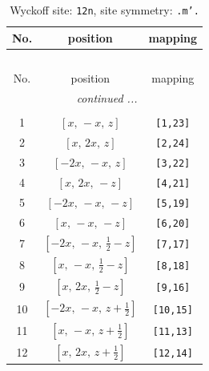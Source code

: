 \documentclass[fleqn,8pt]{jsarticle}
\begin{document}
\begin{longtable}{ccc}
\caption{Wyckoff site: {\tt 12n}, site symmetry: {\tt .m'.}}
 \\
 \hline \hline
No. & position & mapping \\ \hline \endfirsthead

\multicolumn{2}{l}{\tablename\ \thetable{}} \\
 \hline \hline
No. & position & mapping \\ \hline \endhead

 \hline \hline
\multicolumn{2}{r}{\footnotesize\it continued ...} \\ \endfoot

 \hline \hline
\multicolumn{2}{r}{} \\ \endlastfoot

1 & $\left[ x,\, - x,\, z \right]$ & {\tt [1,23]} \\ \hline
2 & $\left[ x,\, 2 x,\, z \right]$ & {\tt [2,24]} \\ \hline
3 & $\left[ - 2 x,\, - x,\, z \right]$ & {\tt [3,22]} \\ \hline
4 & $\left[ x,\, 2 x,\, - z \right]$ & {\tt [4,21]} \\ \hline
5 & $\left[ - 2 x,\, - x,\, - z \right]$ & {\tt [5,19]} \\ \hline
6 & $\left[ x,\, - x,\, - z \right]$ & {\tt [6,20]} \\ \hline
7 & $\left[ - 2 x,\, - x,\, \frac{1}{2} - z \right]$ & {\tt [7,17]} \\ \hline
8 & $\left[ x,\, - x,\, \frac{1}{2} - z \right]$ & {\tt [8,18]} \\ \hline
9 & $\left[ x,\, 2 x,\, \frac{1}{2} - z \right]$ & {\tt [9,16]} \\ \hline
10 & $\left[ - 2 x,\, - x,\, z + \frac{1}{2} \right]$ & {\tt [10,15]} \\ \hline
11 & $\left[ x,\, - x,\, z + \frac{1}{2} \right]$ & {\tt [11,13]} \\ \hline
12 & $\left[ x,\, 2 x,\, z + \frac{1}{2} \right]$ & {\tt [12,14]} \\
\end{longtable}
\renewcommand{\arraystretch}{1.2}
\end{document}
